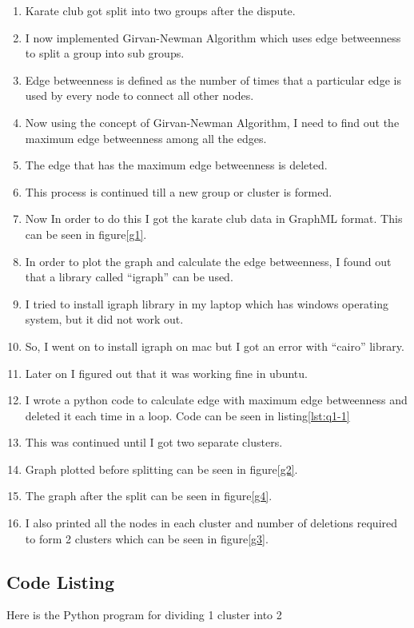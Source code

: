 \begin{enumerate}
\item Karate club got split into two groups after the dispute.
\item I now implemented Girvan-Newman Algorithm which uses edge betweenness to split a group into sub groups.
\item Edge betweenness is defined as the number of times that a particular edge is used by every node to connect all other nodes. 
\item Now using the concept of Girvan-Newman Algorithm, I need to find out the maximum edge betweenness among all the edges.
\item The edge that has the maximum edge betweenness is deleted.
\item This process is continued till a new group or cluster is formed.
\item Now In order to do this I got the karate club data in GraphML format. This can be seen in figure\ref{g1}.
\item In order to plot the graph and calculate the edge betweenness, I found out that a library called ``igraph'' can be used.
\item I tried to install igraph library in my laptop which has windows operating system, but it did not work out.
\item So, I went on to install igraph on mac but I got an error with ``cairo'' library. 
\item Later on I figured out that it was working fine in ubuntu. 
\item I wrote a python code to calculate edge with maximum edge betweenness and deleted it each time in a loop. Code can be seen in listing\ref{lst:q1-1}
\item This was continued until I got two separate clusters. 
\item Graph plotted before splitting can be seen in figure\ref{g2}.
\item The graph after the split can be seen in figure\ref{g4}.
\item I also printed all the nodes in each cluster and number of deletions required to form 2 clusters which can be seen in figure\ref{g3}.

\end{enumerate}

\subsection{Code Listing}
Here is the Python program for dividing 1 cluster into 2

